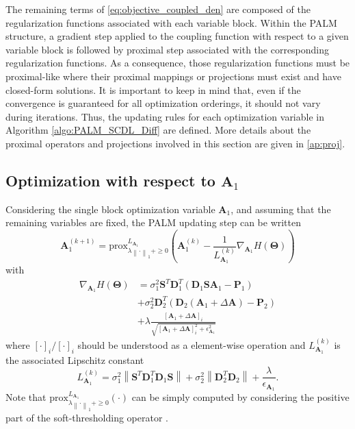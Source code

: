 \documentclass[review]{elsarticle}
\begin{document}
The remaining terms of \eqref{eq:objective_coupled_den} are composed of the regularization functions associated with each variable block. Within the PALM structure, a gradient step applied to the coupling function with respect to a given variable block is followed by proximal step associated with the corresponding regularization functions. As a consequence, those regularization functions must be proximal-like where their proximal mappings or projections must exist and have closed-form solutions. It is important to keep in mind that, even if the convergence is guaranteed for all optimization orderings, it should not vary during iterations. Thus, the updating rules for each optimization variable in Algorithm \ref{algo:PALM_SCDL_Diff} are defined. More details about the proximal operators and projections involved in this section are given in \ref{ap:proj}.

\subsection{Optimization with respect to \texorpdfstring{$\mathbf{A}_{1}$}{A}}

Considering the single block optimization variable $\mathbf{A}_{1}$, and assuming that the remaining variables are fixed, the PALM updating step can be written
%
\begin{equation}
		\mathbf{A}_{1}^{(k+1)} = \mathrm{prox}^{L_{\mathbf{A}_{1}}}_{\lambda\left\|\cdot\right\|_1 + \geq0}\left(\mathbf{A}_{1}^{(k)} - \frac{1}{L_{\mathbf{A}_{1}}^{(k)} }\nabla_{\mathbf{A}_{1}} H(\boldsymbol{\Theta}) \right)
        \label{eq:code_Update}
\end{equation}
%
with
\begin{equation}
\begin{aligned}
		\nabla_{\mathbf{A}_{1}} H(\boldsymbol{\Theta}) &= \sigma_{1}^2\mathbf{S}^{T}\mathbf{D}_{1}^{T}\left( \mathbf{D}_{1}\mathbf{S}\mathbf{A}_{1} - \mathbf{P}_{1}\right) \\
&+\sigma_{2}^2\mathbf{D}_{2}^{T}\left( \mathbf{D}_{2}\left(\mathbf{A}_{1} + \Delta\mathbf{A}\right)-\mathbf{P}_{2}\right)  \\
&+ \lambda \frac{\left[\mathbf{A}_{1} + \Delta\mathbf{A}\right]_{i}}{\sqrt{\left[\mathbf{A}_{1} + \Delta\mathbf{A}\right]_{i}^{2} + \epsilon_{\mathbf{A}_{1}}^{2}}}
        \label{eq:nabla_code}
\end{aligned}
\end{equation}
where $[\cdot]_i/[\cdot]_i$ should be understood as a element-wise operation and $L_{\mathbf{A}_{1}}^{(k)}$ is the associated Lipschitz constant
%
\begin{equation}
		L_{\mathbf{A}_{1}}^{(k)} = \sigma_{1}^2\left\|\mathbf{S}^{T}\mathbf{D}_{1}^{T}\mathbf{D}_{1}\mathbf{S}\right\| +  \sigma_{2}^2\left\|\mathbf{D}_{2}^{T}\mathbf{D}_{2}\right\| + \frac{\lambda}{\epsilon_{\mathbf{A}_{1}}}.
        \label{eq:lip_code}
\end{equation}
%
Note that $\mathrm{prox}^{L_{\mathbf{A}_{1}}}_{\lambda\left\|\cdot\right\|_1 + \geq0}(\cdot)$ can be simply computed by considering the positive part of the soft-thresholding operator \citep{parikh_proximal_2014}.
\end{document}
